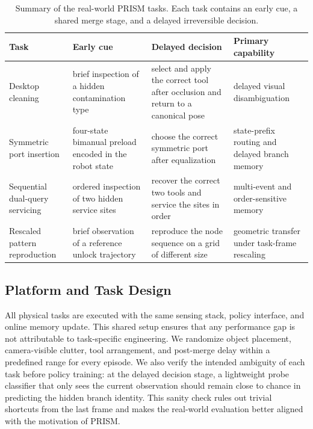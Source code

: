 \begin{table}[t]
    \centering
    \small
    \caption{Summary of the real-world PRISM tasks. Each task contains an early cue, a shared merge stage, and a delayed irreversible decision.}
    \label{tab:real_world_tasks}
    \begin{tabular}{p{2.8cm}p{3.0cm}p{3.1cm}p{3.0cm}}
        \toprule
        Task & Early cue & Delayed decision & Primary capability \\
        \midrule
        Desktop cleaning & brief inspection of a hidden contamination type & select and apply the correct tool after occlusion and return to a canonical pose & delayed visual disambiguation \\
        Symmetric port insertion & four-state bimanual preload encoded in the robot state & choose the correct symmetric port after equalization & state-prefix routing and delayed branch memory \\
        Sequential dual-query servicing & ordered inspection of two hidden service sites & recover the correct two tools and service the sites in order & multi-event and order-sensitive memory \\
        Rescaled pattern reproduction & brief observation of a reference unlock trajectory & reproduce the node sequence on a grid of different size & geometric transfer under task-frame rescaling \\
        \bottomrule
    \end{tabular}
\end{table}

\subsection{Platform and Task Design}
\label{sec:real_world_setup}

All physical tasks are executed with the same sensing stack, policy interface, and online memory update. This shared setup ensures that any performance gap is not attributable to task-specific engineering. We randomize object placement, camera-visible clutter, tool arrangement, and post-merge delay within a predefined range for every episode. We also verify the intended ambiguity of each task before policy training: at the delayed decision stage, a lightweight probe classifier that only sees the current observation should remain close to chance in predicting the hidden branch identity. This sanity check rules out trivial shortcuts from the last frame and makes the real-world evaluation better aligned with the motivation of PRISM.

